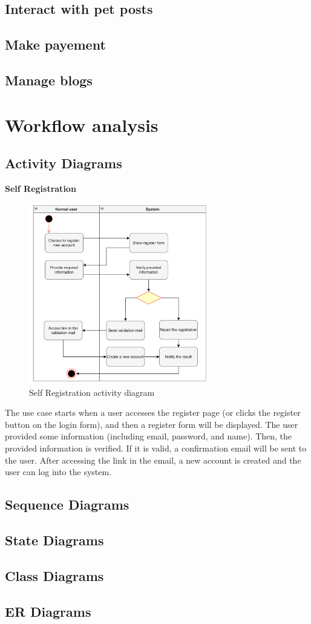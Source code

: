 \subsection{Interact with pet posts}
\subsection{Make payement}
\subsection{Manage blogs}

\section{Workflow analysis}
\subsection{Activity Diagrams}

\textbf{Self Registration}

\begin{figure}[htbp]
  \centering
  \includegraphics[width=0.7\textwidth]{Figures/self_register.png}
  \caption{Self Registration activity diagram}
  \label{fig:self-registration}
\end{figure}

The use case starts when a user accesses the register page (or clicks the register button on the login form), and then a register form will be displayed. The user provided some information (including email, password, and name). Then,  the provided information is verified. If it is valid, a confirmation email will be sent to the user. After accessing the link in the email, a new account is created and the user can log into the system.

\subsection{Sequence Diagrams}
\subsection{State Diagrams}
\subsection{Class Diagrams}
\subsection{ER Diagrams}


